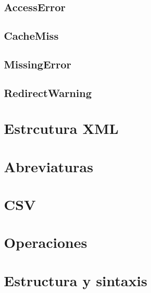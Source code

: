 \documentclass[letterpaper,10pt,spanish]{sphinxmanual}
\begin{document}
\subsection{AccessError}
\label{\detokenize{tecnico/orm-api/manejo-de-errores:accesserror}}

\subsection{CacheMiss}
\label{\detokenize{tecnico/orm-api/manejo-de-errores:cachemiss}}

\subsection{MissingError}
\label{\detokenize{tecnico/orm-api/manejo-de-errores:missingerror}}

\subsection{RedirectWarning}
\label{\detokenize{tecnico/orm-api/manejo-de-errores:redirectwarning}}


\section{Estrcutura XML}
\label{\detokenize{tecnico/datos:estrcutura-xml}}\label{\detokenize{tecnico/datos:datos}}\label{\detokenize{tecnico/datos::doc}}

\section{Abreviaturas}
\label{\detokenize{tecnico/datos:abreviaturas}}

\section{CSV}
\label{\detokenize{tecnico/datos:csv}}

\section{Operaciones}
\label{\detokenize{tecnico/datos:operaciones}}


\section{Estructura y sintaxis}
\label{\detokenize{tecnico/vistas/estructura-y-sintaxis:estructura-y-sintaxis}}\label{\detokenize{tecnico/vistas/estructura-y-sintaxis:id1}}\label{\detokenize{tecnico/vistas/estructura-y-sintaxis::doc}}
\end{document}
